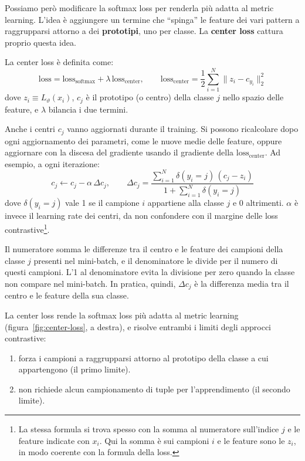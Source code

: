 Possiamo però modificare la softmax loss per renderla più adatta al metric learning. L'idea è aggiungere un termine che ``spinga'' le feature dei vari pattern a raggrupparsi attorno a dei \textbf{prototipi}, uno per classe. La \textbf{center loss} \cite{Wen2016} cattura proprio questa idea.

\begin{definizione}
La center loss è definita come:
\[
\mathrm{loss} = \mathrm{loss}_{\mathrm{softmax}} + \lambda\,\mathrm{loss}_{\mathrm{center}}, \qquad \mathrm{loss}_{\mathrm{center}} = \frac{1}{2}\sum_{i=1}^{N} \big\|z_i - c_{y_i}\big\|_2^2
\]
dove $z_i \equiv L_\vartheta(x_i)$, $c_j$ è il prototipo (o centro) della classe $j$ nello spazio delle feature, e $\lambda$ bilancia i due termini.
\end{definizione}

Anche i centri $c_j$ vanno aggiornati durante il training. Si possono ricalcolare dopo ogni aggiornamento dei parametri, come le nuove medie delle feature, oppure aggiornare con la discesa del gradiente usando il gradiente della $\mathrm{loss}_{\mathrm{center}}$. Ad esempio, a ogni iterazione:
\[
c_j \gets c_j - \alpha\, \Delta c_j, \qquad
\Delta c_j = \frac{\sum_{i=1}^{N} \delta(y_i = j)\, (c_j - z_i)}{1 + \sum_{i=1}^{N} \delta(y_i = j)}
\]
dove $\delta(y_i = j)$ vale 1 se il campione $i$ appartiene alla classe $j$ e 0 altrimenti. $\alpha$ è invece il learning rate dei centri, da non confondere con il margine delle loss contrastive\footnote{La stessa formula si trova spesso con la somma al numeratore sull'indice $j$ e le feature indicate con $x_i$. Qui la somma è sui campioni $i$ e le feature sono le $z_i$, in modo coerente con la formula della loss.}.

Il numeratore somma le differenze tra il centro e le feature dei campioni della classe $j$ presenti nel mini-batch, e il denominatore le divide per il numero di questi campioni. L'1 al denominatore evita la divisione per zero quando la classe non compare nel mini-batch. In pratica, quindi, $\Delta c_j$ è la differenza media tra il centro e le feature della sua classe.

La center loss rende la softmax loss più adatta al metric learning (figura~\ref{fig:center-loss}, a destra), e risolve entrambi i limiti degli approcci contrastive:
\begin{enumerate}
    \item forza i campioni a raggrupparsi attorno al prototipo della classe a cui appartengono (il primo limite).
    \item non richiede alcun campionamento di tuple per l'apprendimento (il secondo limite).
\end{enumerate}

